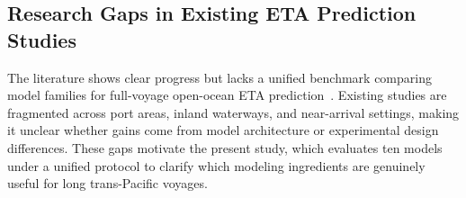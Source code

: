\documentclass[sigconf,anonymous]{acmart}%
\begin{document}








\subsection{Research Gaps in Existing ETA Prediction Studies}
The literature shows clear progress but lacks a unified benchmark comparing model families for full-voyage open-ocean ETA prediction~\cite{jiangPredictionVesselArrival2025,nomanReviewVesselTime2025}. Existing studies are fragmented across port areas, inland waterways, and near-arrival settings, making it unclear whether gains come from model architecture or experimental design differences. These gaps motivate the present study, which evaluates ten models under a unified protocol to clarify which modeling ingredients are genuinely useful for long trans-Pacific voyages.
\end{document}
